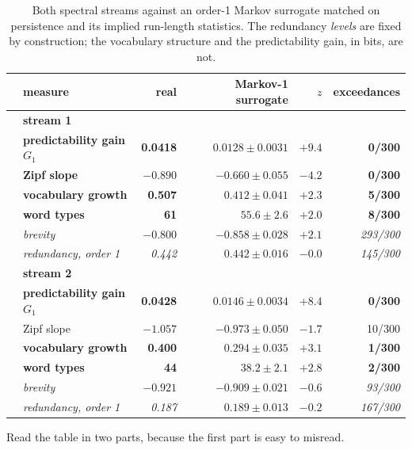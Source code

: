 \documentclass[11pt,a4paper]{article}
\newcommand{\bnum}[1]{\textbf{#1}}
\begin{document}
\begin{table}[htbp]
\centering
\caption{Both spectral streams against an order-1 Markov surrogate matched on
persistence and its implied run-length statistics. The redundancy \emph{levels} are
fixed by construction; the vocabulary structure and the predictability gain, in bits,
are not.}
\label{tab:markov}
\small
\begin{tabular}{llrrrr}
\toprule
 & measure & real & Markov-1 surrogate & $z$ & exceedances \\
\midrule
 & \multicolumn{5}{l}{\textbf{stream 1}} \\
 & \bnum{predictability gain $G_1$} & \bnum{0.0418} & $0.0128 \pm 0.0031$ & $\mathbf{+9.4}$ & \bnum{0/300} \\
 & \bnum{Zipf slope} & $\mathbf{-0.890}$ & $-0.660 \pm 0.055$ & $\mathbf{-4.2}$ & \bnum{0/300} \\
 & \bnum{vocabulary growth} & \bnum{0.507} & $0.412 \pm 0.041$ & $\mathbf{+2.3}$ & \bnum{5/300} \\
 & \bnum{word types} & \bnum{61} & $55.6 \pm 2.6$ & $\mathbf{+2.0}$ & \bnum{8/300} \\
 & \emph{brevity} & \emph{$-0.800$} & \emph{$-0.858 \pm 0.028$} & \emph{$+2.1$} & \emph{293/300} \\
 & \emph{redundancy, order 1} & \emph{0.442} & \emph{$0.442 \pm 0.016$} & \emph{$-0.0$} & \emph{145/300} \\
\midrule
 & \multicolumn{5}{l}{\textbf{stream 2}} \\
 & \bnum{predictability gain $G_1$} & \bnum{0.0428} & $0.0146 \pm 0.0034$ & $\mathbf{+8.4}$ & \bnum{0/300} \\
 & Zipf slope & $-1.057$ & $-0.973 \pm 0.050$ & $-1.7$ & 10/300 \\
 & \bnum{vocabulary growth} & \bnum{0.400} & $0.294 \pm 0.035$ & $\mathbf{+3.1}$ & \bnum{1/300} \\
 & \bnum{word types} & \bnum{44} & $38.2 \pm 2.1$ & $\mathbf{+2.8}$ & \bnum{2/300} \\
 & \emph{brevity} & \emph{$-0.921$} & \emph{$-0.909 \pm 0.021$} & \emph{$-0.6$} & \emph{93/300} \\
 & \emph{redundancy, order 1} & \emph{0.187} & \emph{$0.189 \pm 0.013$} & \emph{$-0.2$} & \emph{167/300} \\
\bottomrule
\end{tabular}
\end{table}

Read the table in two parts, because the first part is easy to misread.
\end{document}
